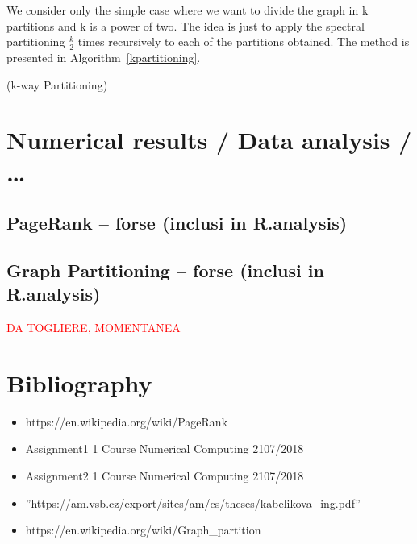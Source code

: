 \documentclass[]{usiinfbachelorproject}
\makeatletter
\def\BState{\State\hskip-\ALG@thistlm}
\makeatother
\begin{document}
We consider only the simple case where we want to divide the graph in k partitions and k is a power of two. The idea is just to apply the spectral partitioning $\frac{k}{2}$ times recursively to each of the partitions obtained. The method is presented in Algorithm~\ref{kpartitioning}.

\begin{algorithm}
\caption{ (k-way Partitioning)}\label{kpartitioning}
\end{algorithm}


\section{Numerical results / Data analysis / \ldots}

\subsection{PageRank -- forse (inclusi in R.analysis)}

\subsection{Graph Partitioning -- forse (inclusi in R.analysis)}

\newpage
\textcolor{red}{DA TOGLIERE, MOMENTANEA}
\section{Bibliography}
\begin{itemize}
\item https://en.wikipedia.org/wiki/PageRank
\item Assignment1 1 Course Numerical Computing 2107/2018
\item Assignment2 1 Course Numerical Computing 2107/2018
\item \hyperref[label_name]{''https://am.vsb.cz/export/sites/am/cs/theses/kabelikova\_ing.pdf''}
\item https://en.wikipedia.org/wiki/Graph\_partition
\end{itemize}
\end{document}
